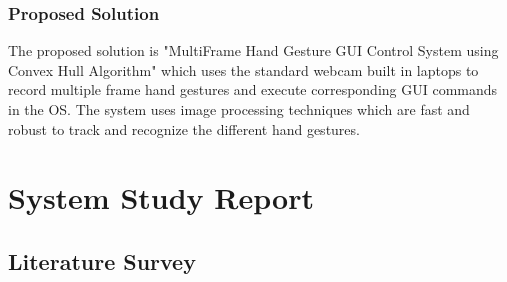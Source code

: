 \documentclass[11pt]{report}
\begin{document}
\subsection{Proposed Solution}
The proposed solution is "MultiFrame Hand Gesture GUI Control System using Convex Hull Algorithm" which uses the standard webcam built in laptops to record multiple frame hand gestures and execute corresponding GUI commands in the OS. The system uses image processing techniques which are fast and robust to track and recognize the different hand gestures.



\chapter{System Study Report}
\section{Literature Survey}
\end{document}
